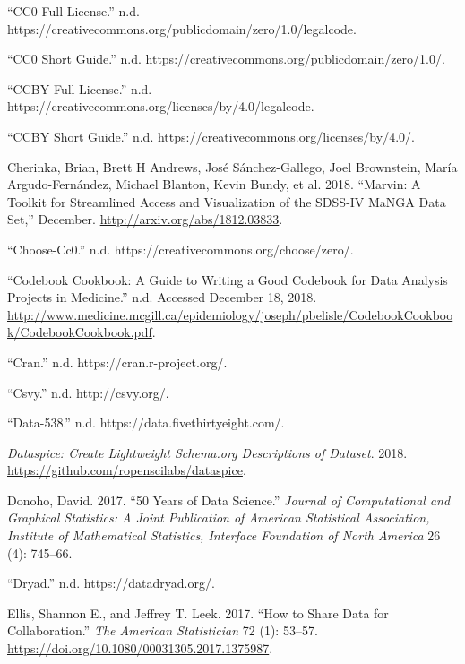 \documentclass[
]{article}
\newlength{\cslhangindent}
\newenvironment{cslreferences}%
  {\setlength{\parindent}{0pt}%
  \everypar{\setlength{\hangindent}{\cslhangindent}}\ignorespaces}%
  {\par}
\begin{document}
\begin{cslreferences}
\leavevmode\hypertarget{ref-cc0-long}{}%
``CC0 Full License.'' n.d. https://creativecommons.org/publicdomain/zero/1.0/legalcode.

\leavevmode\hypertarget{ref-cc0-short}{}%
``CC0 Short Guide.'' n.d. https://creativecommons.org/publicdomain/zero/1.0/.

\leavevmode\hypertarget{ref-ccby-long}{}%
``CCBY Full License.'' n.d. https://creativecommons.org/licenses/by/4.0/legalcode.

\leavevmode\hypertarget{ref-ccby-short}{}%
``CCBY Short Guide.'' n.d. https://creativecommons.org/licenses/by/4.0/.

\leavevmode\hypertarget{ref-marvin-service}{}%
Cherinka, Brian, Brett H Andrews, José Sánchez-Gallego, Joel Brownstein, María Argudo-Fernández, Michael Blanton, Kevin Bundy, et al. 2018. ``Marvin: A Toolkit for Streamlined Access and Visualization of the SDSS-IV MaNGA Data Set,'' December. \url{http://arxiv.org/abs/1812.03833}.

\leavevmode\hypertarget{ref-choose-cc0}{}%
``Choose-Cc0.'' n.d. https://creativecommons.org/choose/zero/.

\leavevmode\hypertarget{ref-McGill-codebook}{}%
``Codebook Cookbook: A Guide to Writing a Good Codebook for Data Analysis Projects in Medicine.'' n.d. Accessed December 18, 2018. \url{http://www.medicine.mcgill.ca/epidemiology/joseph/pbelisle/CodebookCookbook/CodebookCookbook.pdf}.

\leavevmode\hypertarget{ref-cran}{}%
``Cran.'' n.d. https://cran.r-project.org/.

\leavevmode\hypertarget{ref-csvy}{}%
``Csvy.'' n.d. http://csvy.org/.

\leavevmode\hypertarget{ref-data-538}{}%
``Data-538.'' n.d. https://data.fivethirtyeight.com/.

\leavevmode\hypertarget{ref-dataspice}{}%
\emph{Dataspice: Create Lightweight Schema.org Descriptions of Dataset}. 2018. \url{https://github.com/ropenscilabs/dataspice}.

\leavevmode\hypertarget{ref-Donoho2017}{}%
Donoho, David. 2017. ``50 Years of Data Science.'' \emph{Journal of Computational and Graphical Statistics: A Joint Publication of American Statistical Association, Institute of Mathematical Statistics, Interface Foundation of North America} 26 (4): 745--66.

\leavevmode\hypertarget{ref-dryad}{}%
``Dryad.'' n.d. https://datadryad.org/.

\leavevmode\hypertarget{ref-Ellis2017}{}%
Ellis, Shannon E., and Jeffrey T. Leek. 2017. ``How to Share Data for Collaboration.'' \emph{The American Statistician} 72 (1): 53--57. \url{https://doi.org/10.1080/00031305.2017.1375987}.


\end{cslreferences}
\end{document}

